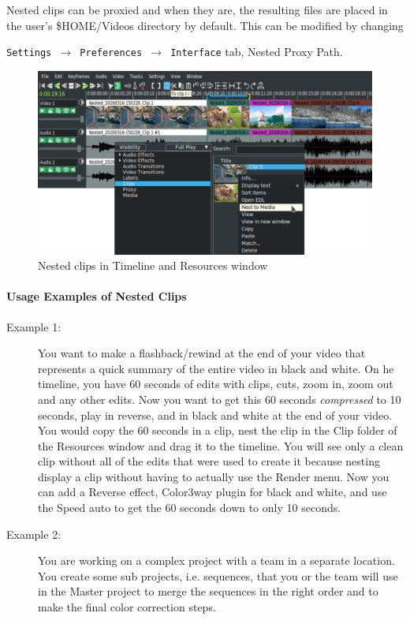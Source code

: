 Nested clips can be proxied and when they are, the resulting files
are placed in the user's \$HOME/Videos directory by default.  This can be modified by changing

\texttt{Settings $\rightarrow$ Preferences $\rightarrow$ Interface} tab, Nested Proxy Path.
\begin{figure}[htpb]
    \centering
    \includegraphics[width=0.9\linewidth]{images/nesting.png}
    \caption{Nested clips in Timeline and Resources window}
    \label{fig:nesting}
\end{figure}

\paragraph{Usage Examples of Nested Clips}

\begin{description}
    \item[Example 1:] You want to make a flashback/rewind at the end of your video
that represents a quick summary of the entire video in black and white. On
he timeline, you have 60 seconds of edits with clips, cuts, zoom in, zoom
out and any other edits. Now you want to get this 60 seconds \textit{compressed}
to 10 seconds, play in reverse, and in black and white at the end of your
    video.    
    You would copy the 60 seconds in a clip, nest the clip in the Clip folder
of the Resources window and drag it to the timeline. You will see only a
clean clip without all of the edits that were used to create it because
nesting display a clip without having to actually use the Render menu.
    Now you can add a Reverse effect, Color3way plugin for black and white, and
use the Speed auto to get the 60 seconds down to only 10 seconds.
    \item[Example 2:] You are working on a complex project with a team in a separate
location. You create some sub projects, i.e. sequences, that you or the
team will use in the Master project to merge the sequences in the right
order and to make the final color correction steps.
\end{description}


